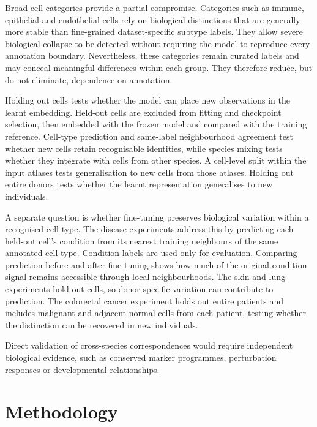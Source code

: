 \documentclass{article}
\begin{document}
Broad cell categories provide a partial compromise. Categories such as immune, epithelial and endothelial cells rely on biological distinctions that are generally more stable than fine-grained dataset-specific subtype labels. They allow severe biological collapse to be detected without requiring the model to reproduce every annotation boundary. Nevertheless, these categories remain curated labels and may conceal meaningful differences within each group. They therefore reduce, but do not eliminate, dependence on annotation.

Holding out cells tests whether the model can place new observations in the learnt embedding. Held-out cells are excluded from fitting and checkpoint selection, then embedded with the frozen model and compared with the training reference. Cell-type prediction and same-label neighbourhood agreement test whether new cells retain recognisable identities, while species mixing tests whether they integrate with cells from other species. A cell-level split within the input atlases tests generalisation to new cells from those atlases. Holding out entire donors tests whether the learnt representation generalises to new individuals.

A separate question is whether fine-tuning preserves biological variation within a recognised cell type. The disease experiments address this by predicting each held-out cell's condition from its nearest training neighbours of the same annotated cell type. Condition labels are used only for evaluation. Comparing prediction before and after fine-tuning shows how much of the original condition signal remains accessible through local neighbourhoods. The skin and lung experiments hold out cells, so donor-specific variation can contribute to prediction. The colorectal cancer experiment holds out entire patients and includes malignant and adjacent-normal cells from each patient, testing whether the distinction can be recovered in new individuals.

Direct validation of cross-species correspondences would require independent biological evidence, such as conserved marker programmes, perturbation responses or developmental relationships.
\section{Methodology}
\end{document}
